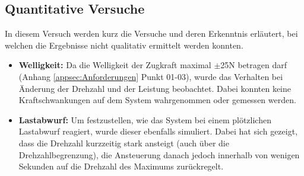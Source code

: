 \subsection{Quantitative Versuche}\label{subsec:Quantitative}
In diesem Versuch werden kurz die Versuche und deren Erkenntnis erläutert, bei welchen die Ergebnisse nicht qualitativ ermittelt werden konnten.
\begin{itemize}
	\item \textbf{Welligkeit:} Da die Welligkeit der Zugkraft maximal $\pm$25N betragen darf (Anhang \ref{appsec:Anforderungen} Punkt 01-03), wurde das Verhalten bei Änderung der Drehzahl und der Leistung beobachtet. Dabei konnten keine Kraftschwankungen auf dem System wahrgenommen oder gemessen werden.
	\item \textbf{Lastabwurf:} Um festzustellen, wie das System bei einem plötzlichen Lastabwurf reagiert, wurde dieser ebenfalls simuliert. Dabei hat sich gezeigt, dass die Drehzahl kurzzeitig stark ansteigt (auch über die Drehzahlbegrenzung), die Ansteuerung danach jedoch innerhalb von wenigen Sekunden auf die Drehzahl des Maximums zurückregelt.
\end{itemize}